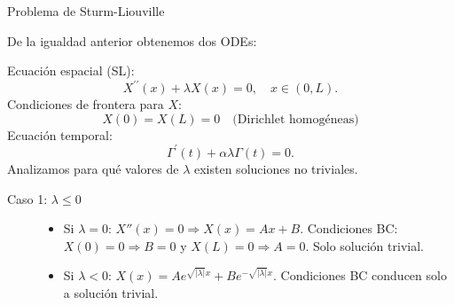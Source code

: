 \begin{solutionordottedlines}
\begin{parts}
		Problema de Sturm-Liouville

		De la igualdad anterior obtenemos dos ODEs:

		Ecuación espacial (SL):
		\begin{equation*}
			X^{\prime\prime}\left(x\right)+
			\lambda X\left(x\right)=0,\quad
			x\in\left(0,L\right).
		\end{equation*}
		Condiciones de frontera para $X$:
		\begin{equation*}
			X\left(0\right)=
			X\left(L\right)=0
			\quad \text{(Dirichlet homogéneas)}
		\end{equation*}
		Ecuación temporal:
		\begin{equation*}
			\Gamma^{\prime}\left(t\right)+
			\alpha\lambda\Gamma\left(t\right)=
			0.
		\end{equation*}
		Analizamos para qué valores de $\lambda$ existen soluciones no triviales.
		\begin{description}
			\item[Caso 1: $\lambda\leq 0$]
			      \begin{itemize}
				      \item

				            Si $\lambda = 0$: $X''(x) = 0 \Rightarrow X(x) = Ax + B$. Condiciones BC: $X(0) = 0 \Rightarrow B = 0$ y $X(L) = 0 \Rightarrow A = 0$. Solo solución trivial.
				      \item
				            Si $\lambda < 0$: $X(x) = A e^{\sqrt{|\lambda|}x} + B e^{-\sqrt{|\lambda|}x}$. Condiciones BC conducen solo a solución trivial.
			      \end{itemize}
			\item[]
		\end{description}










\end{parts}
\end{solutionordottedlines}
